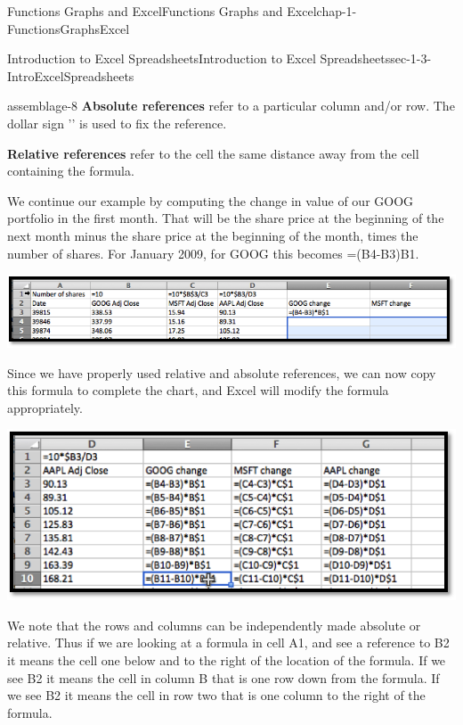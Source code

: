 \documentclass[oneside,10pt,]{book}
\newcommand{\terminology}[1]{\textbf{#1}}
\numberwithin{equation}{section}
\begin{document}
\begin{chapterptx}{Functions Graphs and Excel}{}{Functions Graphs and Excel}{}{}{chap-1-FunctionsGraphsExcel}
\begin{sectionptx}{Introduction to Excel Spreadsheets}{}{Introduction to Excel Spreadsheets}{}{}{sec-1-3-IntroExcelSpreadsheets}
\begin{assemblage}{}{assemblage-8}%
\hypertarget{p-253}{}%
\terminology{Absolute references} refer to a particular column and\slash{}or row.  The dollar sign '\textdollar{}' is used to fix the reference.%
\par
\hypertarget{p-254}{}%
\terminology{Relative references} refer to the cell the same distance away from the cell containing the formula.%
\end{assemblage}
\hypertarget{p-255}{}%
We continue our example by computing the change in value of our GOOG portfolio in the first month.  That will be the share price at the beginning of the next month minus the share price at the beginning of the month, times the number of shares.  For January 2009, for GOOG this becomes =(B4-B3)\textasteriskcentered{}B\textdollar{}1.%
\begin{sidebyside}{1}{0.05}{0.05}{0}%
\begin{sbspanel}{0.9}%
\includegraphics[width=1\linewidth]{images/sec1-3-11.png}
\end{sbspanel}%
\end{sidebyside}%
\par
\hypertarget{p-256}{}%
Since we have properly used relative and absolute references, we can now copy this formula to complete the chart, and Excel will modify the formula appropriately.%
\begin{sidebyside}{1}{0.1}{0.1}{0}%
\begin{sbspanel}{0.8}%
\includegraphics[width=1\linewidth]{images/sec1-3-12.png}
\end{sbspanel}%
\end{sidebyside}%
\par
\hypertarget{p-257}{}%
We note that the rows and columns can be independently made absolute or relative.  Thus if we are looking at a formula in cell A1, and see a reference to B2 it means the cell one below and to the right of the location of the formula.  If we see \textdollar{}B2 it means the cell in column B that is one row down from the formula.  If we see B\textdollar{}2 it means the cell in row two that is one column to the right of the formula.%

\end{sectionptx}
\end{chapterptx}
\end{document}
